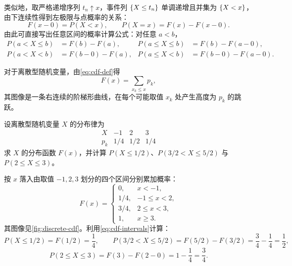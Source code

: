 类似地，取严格递增序列 $t_n\uparrow x$，事件列 $\{X\le t_n\}$ 单调递增且并集为 $\{X<x\}$，由下连续性得到左极限与点概率的关系：
\begin{equation}
  F(x-0)=P(X<x),\qquad P(X=x)=F(x)-F(x-0).
  \label{eq:cdf-jump}
\end{equation}
由此可直接写出任意区间的概率计算公式：对任意 $a<b$，
\begin{equation}
\begin{aligned}
  P(a<X\le b)&=F(b)-F(a),&
  P(a\le X\le b)&=F(b)-F(a-0),\\
  P(a<X<b)&=F(b-0)-F(a),&
  P(a\le X<b)&=F(b-0)-F(a-0).
\end{aligned}
\label{eq:cdf-intervals}
\end{equation}

对于离散型随机变量，由\eqref{eq:cdf-def}得
\[
  F(x)=\sum_{x_k\le x}p_k,
\]
其图像是一条右连续的阶梯形曲线，在每个可能取值 $x_k$ 处产生高度为 $p_k$ 的跳跃。

\begin{example}[title={离散型随机变量的阶梯分布函数}]
\label{eg:discrete-cdf}
设离散型随机变量 $X$ 的分布律为
\[
\begin{array}{c|ccc}
  X & -1 & 2 & 3 \\ \hline
  p_k & 1/4 & 1/2 & 1/4
\end{array}
\]
求 $X$ 的分布函数 $F(x)$，并计算 $P(X\le 1/2)$、$P(3/2<X\le 5/2)$ 与 $P(2\le X\le 3)$。
\begin{solution}
按 $x$ 落入由取值 $-1,2,3$ 划分的四个区间分别累加概率：
\[
  F(x)=
  \begin{cases}
    0,& x<-1,\\
    1/4,& -1\le x<2,\\
    3/4,& 2\le x<3,\\
    1,& x\ge 3.
  \end{cases}
\]
其图像见\cref{fig:discrete-cdf}。利用\eqref{eq:cdf-intervals}计算：
\[
  P(X\le 1/2)=F(1/2)=\frac{1}{4},\qquad
  P(3/2<X\le 5/2)=F(5/2)-F(3/2)=\frac{3}{4}-\frac{1}{4}=\frac{1}{2},
\]
\[
  P(2\le X\le 3)=F(3)-F(2-0)=1-\frac{1}{4}=\frac{3}{4}.
\]
\end{solution}
\end{example}


